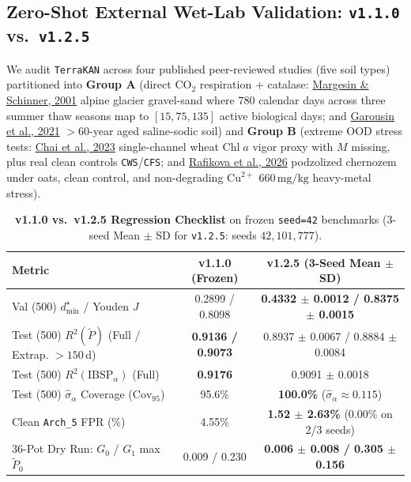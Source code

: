 \documentclass[10pt,twocolumn,a4paper]{article}
\begin{document}
\subsection{Zero-Shot External Wet-Lab Validation: \texttt{v1.1.0} vs.\ \texttt{v1.2.5}}
We audit \texttt{TerraKAN} across four published peer-reviewed studies (five soil types) partitioned into \textbf{Group A} (direct $\mathrm{CO}_2$ respiration + catalase: \href{https://pmc.ncbi.nlm.nih.gov/articles/PMC92991/}{Margesin \& Schinner, 2001} alpine glacier gravel-sand where $780$ calendar days across three summer thaw seasons map to $[15, 75, 135]$ active biological days; and \href{https://pmc.ncbi.nlm.nih.gov/articles/PMC7947215/}{Garousin et al., 2021} $>60$-year aged saline-sodic soil) and \textbf{Group B} (extreme OOD stress tests: \href{https://www.frontiersin.org/journals/environmental-science/articles/10.3389/fenvs.2023.1141562/full}{Chai et al., 2023} single-channel wheat $\mathrm{Chl}\;a$ vigor proxy with $M$ missing, plus real clean controls \texttt{CWS}/\texttt{CFS}; and \href{https://pmc.ncbi.nlm.nih.gov/articles/PMC12945044/}{Rafikova et al., 2026} podzolized chernozem under oats, clean control, and non-degrading $\mathrm{Cu}^{2+}$ $660\,\mathrm{mg/kg}$ heavy-metal stress).

\begin{table}[!htbp]
\centering
\caption{\textbf{v1.1.0 vs.\ v1.2.5 Regression Checklist} on frozen \texttt{seed=42} benchmarks (3-seed Mean $\pm$ SD for \texttt{v1.2.5}: seeds $42, 101, 777$).}
\label{tab:v125_reg}
\small
\begin{tabular}{@{}lcc@{}}
\toprule
\textbf{Metric} & \textbf{v1.1.0 (Frozen)} & \textbf{v1.2.5 (3-Seed Mean $\pm$ SD)} \\
\midrule
Val (500) $d^\star_{\min}$ / Youden $J$ & 0.2899 / 0.8098 & \textbf{0.4332 $\pm$ 0.0012 / 0.8375 $\pm$ 0.0015} \\
Test (500) $R^2(\tilde{P})$ (Full / Extrap. $>150$\,d) & \textbf{0.9136 / 0.9073} & 0.8937 $\pm$ 0.0067 / 0.8884 $\pm$ 0.0084 \\
Test (500) $R^2(\mathrm{IBSP}_\alpha)$ (Full) & \textbf{0.9176} & 0.9091 $\pm$ 0.0018 \\
Test (500) $\hat{\sigma}_\alpha$ Coverage ($\mathrm{Cov}_{95}$) & 95.6\% & \textbf{100.0\%} ($\hat{\sigma}_\alpha \approx 0.115$) \\
Clean \texttt{Arch\_5} FPR (\%) & 4.55\% & \textbf{1.52 $\pm$ 2.63\%} (0.00\% on 2/3 seeds) \\
36-Pot Dry Run: $G_0$ / $G_1$ max $\tilde{P}_0$ & 0.009 / 0.230 & \textbf{0.006 $\pm$ 0.008 / 0.305 $\pm$ 0.156} \\
\bottomrule
\end{tabular}
\end{table}
\end{document}
